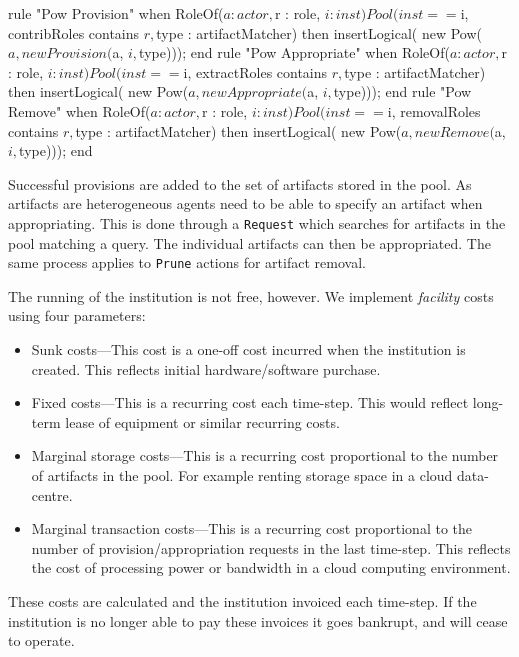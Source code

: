 \begin{drools}[label=lst:provapppow,caption={Institutionalised power for provision, appropration and removal from a pool of artifacts.}]
rule "Pow Provision"
	when
		RoleOf($a : actor, $r : role, $i : inst)
		Pool(inst == $i, contribRoles contains $r, $type : artifactMatcher)
	then
		insertLogical( new Pow($a, new Provision($a, $i, $type)));
end
rule "Pow Appropriate"
	when
		RoleOf($a : actor, $r : role, $i : inst)
		Pool(inst == $i, extractRoles contains $r, $type : artifactMatcher)
	then
		insertLogical( new Pow($a, new Appropriate($a, $i, $type)));
end
rule "Pow Remove"
	when
		RoleOf($a : actor, $r : role, $i : inst)
		Pool(inst == $i, removalRoles contains $r, $type : artifactMatcher)
	then
		insertLogical( new Pow($a, new Remove($a, $i, $type)));
end
\end{drools}

Successful provisions are added to the set of artifacts stored in the pool. As
artifacts are heterogeneous agents need to be able to specify an artifact when
appropriating. This is done through a \texttt{Request} which searches for
artifacts in the pool matching a query. The individual artifacts can then be
appropriated. The same process applies to \texttt{Prune} actions for artifact
removal.

The running of the institution is not free, however. We implement
\emph{facility} costs using four parameters:

\begin{itemize}
\item Sunk costs---This cost is a one-off cost incurred when the institution is created. This reflects initial hardware/software purchase.
\item Fixed costs---This is a recurring cost each time-step. This would reflect long-term lease of equipment or similar recurring costs.
\item Marginal storage costs---This is a recurring cost proportional to the number of artifacts in the pool. For example renting storage space in a cloud data-centre.
\item Marginal transaction costs---This is a recurring cost proportional to the number of provision/appropriation requests in the last time-step. This reflects the cost of processing power or bandwidth in a cloud computing environment.
\end{itemize}

These costs are calculated and the institution invoiced each time-step. If the
institution is no longer able to pay these invoices it goes bankrupt, and will
cease to operate.

